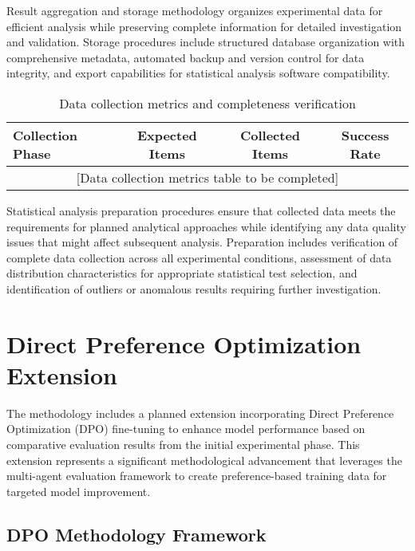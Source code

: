 Result aggregation and storage methodology organizes experimental data for efficient analysis while preserving complete information for detailed investigation and validation. Storage procedures include structured database organization with comprehensive metadata, automated backup and version control for data integrity, and export capabilities for statistical analysis software compatibility.

\begin{table}[htbp]
    \centering
    \caption{Data collection metrics and completeness verification}
    \label{tab:data-collection-metrics}
    \begin{tabular}{|l|c|c|c|}
    \hline
    \textbf{Collection Phase} & \textbf{Expected Items} & \textbf{Collected Items} & \textbf{Success Rate} \\
    \hline
    \multicolumn{4}{|c|}{[Data collection metrics table to be completed]} \\
    \hline
    \end{tabular}
\end{table}

Statistical analysis preparation procedures ensure that collected data meets the requirements for planned analytical approaches while identifying any data quality issues that might affect subsequent analysis. Preparation includes verification of complete data collection across all experimental conditions, assessment of data distribution characteristics for appropriate statistical test selection, and identification of outliers or anomalous results requiring further investigation.

\section{Direct Preference Optimization Extension}
\label{sec:dpo-extension}

The methodology includes a planned extension incorporating Direct Preference Optimization (DPO) fine-tuning to enhance model performance based on comparative evaluation results from the initial experimental phase. This extension represents a significant methodological advancement that leverages the multi-agent evaluation framework to create preference-based training data for targeted model improvement.

\subsection{DPO Methodology Framework}

